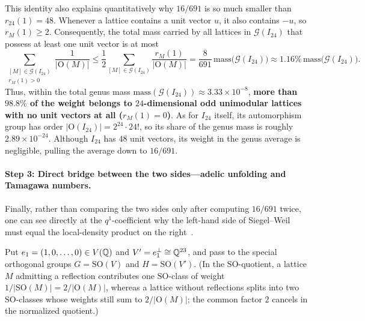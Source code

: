 This identity also explains quantitatively why $16/691$ is so much smaller than $r_{24}(1)=48$. Whenever a lattice contains a unit vector $u$, it also contains $-u$, so $r_M(1)\ge 2$. Consequently, the total mass carried by all lattices in $\mathcal G(I_{24})$ that possess at least one unit vector is at most
\[
\sum_{\substack{[M]\in\mathcal G(I_{24})\\ r_M(1)>0}}\frac{1}{|\mathrm O(M)|}
\le \frac{1}{2}\sum_{[M]\in\mathcal G(I_{24})}\frac{r_M(1)}{|\mathrm O(M)|}
=\frac{8}{691}\,\mathrm{mass}\bigl(\mathcal G(I_{24})\bigr)
\approx 1.16\%\,\mathrm{mass}\bigl(\mathcal G(I_{24})\bigr).
\]
Thus, within the total genus mass $\mathrm{mass}(\mathcal G(I_{24}))\approx 3.33\times 10^{-8}$, \textbf{more than $98.8\%$ of the weight belongs to $24$-dimensional odd unimodular lattices with no unit vectors at all ($r_M(1)=0$)}. As for $I_{24}$ itself, its automorphism group has order $|\mathrm O(I_{24})|=2^{24}\cdot 24!$, so its share of the genus mass is roughly $2.89\times 10^{-24}$. Although $I_{24}$ has $48$ unit vectors, its weight in the genus average is negligible, pulling the average down to $16/691$.

\paragraph{Step 3: Direct bridge between the two sides---adelic unfolding and Tamagawa numbers.}
Finally, rather than comparing the two sides only after computing $16/691$ twice, one can see directly at the $q^1$-coefficient why the left-hand side of Siegel--Weil must equal the local-density product on the right~\cite{Weil1965,Weil1982}.

Put $e_1=(1,0,\ldots,0)\in V(\mathbb{Q})$ and $V'=e_1^\perp\cong\mathbb{Q}^{23}$, and pass to the special orthogonal groups $G=\mathrm{SO}(V)$ and $H=\mathrm{SO}(V')$. (In the $\mathrm{SO}$-quotient, a lattice $M$ admitting a reflection contributes one $\mathrm{SO}$-class of weight $1/|\mathrm{SO}(M)|=2/|\mathrm O(M)|$, whereas a lattice without reflections splits into two $\mathrm{SO}$-classes whose weights still sum to $2/|\mathrm O(M)|$; the common factor $2$ cancels in the normalized quotient.)

